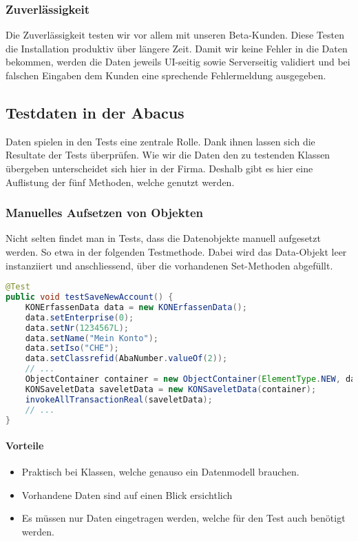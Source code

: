 \subsubsection{Zuverlässigkeit} 
Die Zuverlässigkeit testen wir vor allem mit unseren Beta-Kunden. Diese Testen die Installation produktiv über längere Zeit. Damit wir keine Fehler in die Daten bekommen, werden die Daten jeweils UI-seitig sowie Serverseitig validiert und bei falschen Eingaben dem Kunden eine sprechende Fehlermeldung ausgegeben.


\subsection{Testdaten in der Abacus} \label{Datenspeicherung}
Daten spielen in den Tests eine zentrale Rolle. Dank ihnen lassen sich die Resultate der Tests überprüfen. Wie wir die Daten den zu testenden Klassen übergeben unterscheidet sich hier in der Firma. Deshalb gibt es hier eine Auflistung der fünf Methoden, welche genutzt werden. 
\subsubsection{Manuelles Aufsetzen von Objekten}
Nicht selten findet man in Tests, dass die Datenobjekte manuell aufgesetzt werden. So etwa in der folgenden Testmethode. Dabei wird das Data-Objekt leer instanziiert und anschliessend, über die vorhandenen Set-Methoden abgefüllt.
\begin{lstlisting}[language=Java, caption=Testmethode mit manuell aufgesetztem Datenobjekt]
@Test
public void testSaveNewAccount() {
	KONErfassenData data = new KONErfassenData();
	data.setEnterprise(0);
	data.setNr(1234567L);
	data.setName("Mein Konto");
	data.setIso("CHE");
	data.setClassrefid(AbaNumber.valueOf(2));
	// ...
	ObjectContainer container = new ObjectContainer(ElementType.NEW, data, null, null);
	KONSaveletData saveletData = new KONSaveletData(container);
	invokeAllTransactionReal(saveletData);
	// ...
}
\end{lstlisting}
\paragraph{Vorteile}
\begin{itemize}
\item Praktisch bei Klassen, welche genauso ein Datenmodell brauchen.
\item Vorhandene Daten sind auf einen Blick ersichtlich
\item Es müssen nur Daten eingetragen werden, welche für den Test auch benötigt werden.
\end{itemize}
